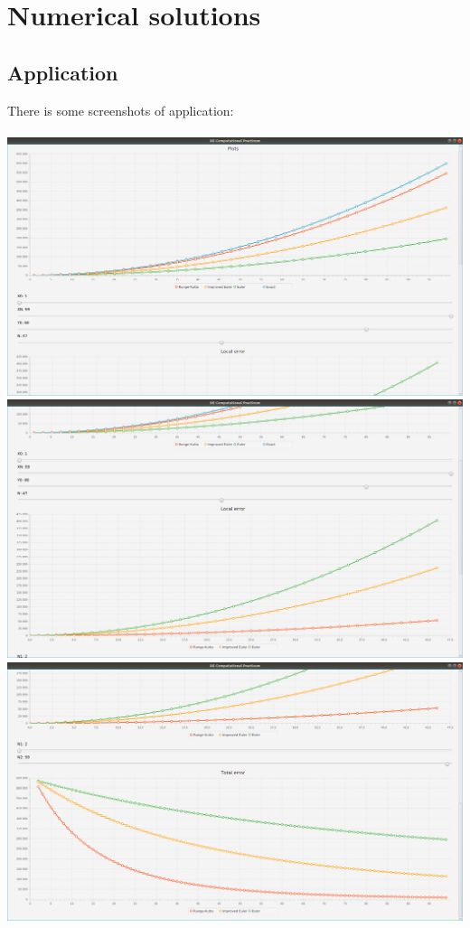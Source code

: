 \documentclass{article}
\begin{document}
\section{Numerical solutions}

\subsection{Application}
There is some screenshots of application:\\ \\
\includegraphics[scale=0.2]{Plots.png} \\ 
\includegraphics[scale=0.2]{LocalErrors.png} \\
\includegraphics[scale=0.2]{TotalErrors.png}
\end{document}
